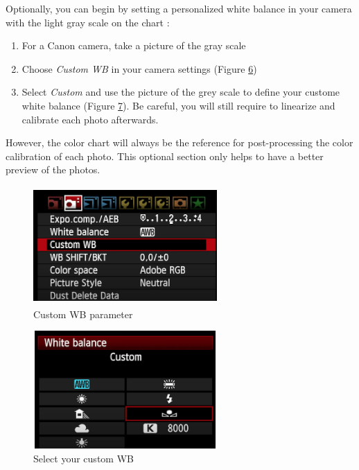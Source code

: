 \documentclass[
]{book}
\theoremstyle{definition}
\theoremstyle{definition}
\theoremstyle{definition}
\theoremstyle{definition}
\theoremstyle{remark}
\begin{document}
Optionally, you can begin by setting a personalized white balance in
your camera with the light gray scale on the chart :

\begin{enumerate}
\def\labelenumi{\arabic{enumi}.}
\item
  For a Canon camera, take a picture of the gray scale
\item
  Choose \emph{Custom WB} in your camera settings (Figure
  \protect\hyperlink{WB_sub1}{6})
\item
  Select \emph{Custom} and use the picture of the grey scale to define your
  custome white balance (Figure \protect\hyperlink{WB_sub2}{7}). Be careful, you will still require to
  linearize and calibrate each photo afterwards.
\end{enumerate}

However, the color chart will always be the reference for
post-processing the color calibration of each photo. This optional
section only helps to have a better preview of the photos.

\begin{figure}
\hypertarget{WB_sub1}{%
\centering
\includegraphics[width=7cm,height=4.5cm]{Figures/Custom WB setting.png}
\caption{Custom WB parameter}\label{WB_sub1}
}
\end{figure}

\begin{figure}
\hypertarget{WB_sub2}{%
\centering
\includegraphics[width=7cm,height=4.5cm]{Figures/Custom WB selection.png}
\caption{Select your custom WB}\label{WB_sub2}
}
\end{figure}
\end{document}
